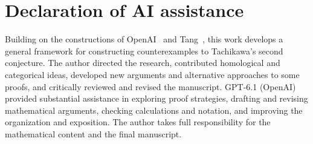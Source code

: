 \documentclass[11pt]{article}
\begin{document}
\section*{Declaration of AI assistance}
Building on the constructions of OpenAI~\cite{O} and Tang~\cite{F},
this work develops a general framework for constructing counterexamples
to Tachikawa's second conjecture. The author directed the research, contributed homological and
categorical ideas, developed new arguments and alternative approaches
to some proofs, and critically reviewed and revised the manuscript.
GPT-6.1 (OpenAI) provided substantial assistance in exploring
proof strategies, drafting and revising mathematical
arguments, checking calculations and notation, and improving the
organization and exposition. The author takes full responsibility for the mathematical content
and the final manuscript.
\end{document}
